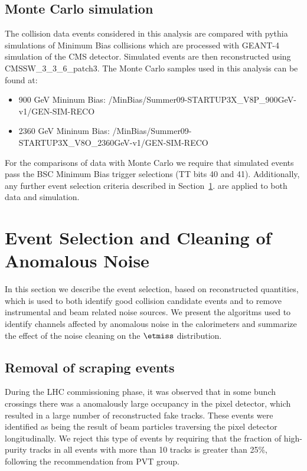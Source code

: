 \subsection{Monte Carlo simulation}

The collision data events considered in this analysis are compared with
{\sc pythia} simulations of Minimum Bias collisions which are processed
with {\sc GEANT-4} simulation of the CMS detector. Simulated events are
then reconstructed using CMSSW\_3\_3\_6\_patch3. The Monte Carlo samples used in
this analysis can be found at:
\begin{itemize}
\item 900 GeV Mininum Bias: /MinBias/Summer09-STARTUP3X\_V8P\_900GeV-v1/GEN-SIM-RECO 
\item 2360 GeV Mininum Bias: /MinBias/Summer09-STARTUP3X\_V8O\_2360GeV-v1/GEN-SIM-RECO
\end{itemize}

For the comparisons of data with Monte Carlo we require that simulated
events pass the BSC Minimum Bias trigger selections (TT bits 40 and
41). Additionally, any further event selection criteria described in Section~\ref{sec:event_selection}.
are applied to both data and simulation.

\section{Event Selection and Cleaning of Anomalous Noise}
\label{sec:event_selection}
In this section we describe the event selection, based on reconstructed quantities, 
which is used to both identify good collision candidate events and to remove instrumental 
and beam related noise sources. We present the algoritms used to 
identify channels affected by anomalous noise in the calorimeters and summarize 
the effect of the noise cleaning on the $\etmiss$ distribution.

\subsection{Removal of scraping events}
\label{sc:scrapingFilter}

During the LHC commissioning phase, it was observed that
in some bunch crossings there was a anomalously large occupancy in the
pixel detector, which resulted in a large number of reconstructed fake
tracks. These events were identified as being the result of beam
particles traversing the pixel detector longitudinally. We reject this
type of events by requiring that the fraction of high-purity tracks in
all events with more than 10 tracks is greater than 25\%, following the 
recommendation from PVT group.

